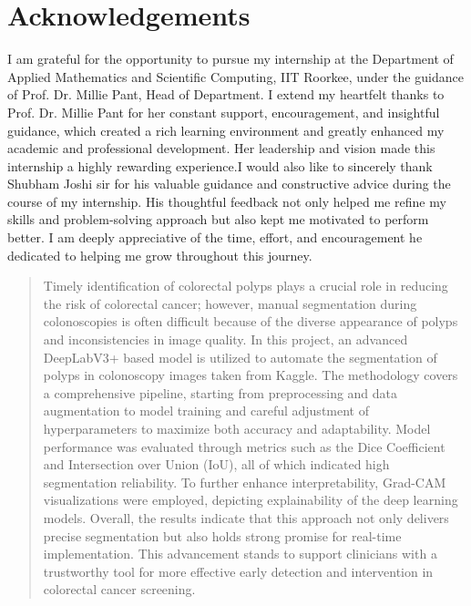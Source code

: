 \documentclass[a4paper,12pt]{report}
\begin{document}
\chapter*{Acknowledgements}
\thispagestyle{empty}

I am grateful for the opportunity to pursue my internship at the Department of Applied Mathematics and Scientific Computing, IIT Roorkee, under the guidance of Prof. Dr. Millie Pant, Head of Department. I extend my heartfelt thanks to Prof. Dr. Millie Pant for her constant support, encouragement, and insightful guidance, which created a rich learning environment and greatly enhanced my academic and professional development. Her leadership and vision made this internship a highly rewarding experience.\newline I would also like to sincerely thank Shubham Joshi sir for his valuable guidance and constructive advice during the course of my internship. His thoughtful feedback not only helped me refine my skills and problem‑solving approach but also kept me motivated to perform better. I am deeply appreciative of the time, effort, and encouragement he dedicated to helping me grow throughout this journey.

\clearpage


\begin{abstract}
Timely identification of colorectal polyps plays a crucial role in reducing the risk of colorectal cancer; however, manual segmentation during colonoscopies is often difficult because of the diverse appearance of polyps and inconsistencies in image quality. In this project, an advanced DeepLabV3+ based model is utilized to automate the segmentation of polyps in colonoscopy images taken from Kaggle. The methodology covers a comprehensive pipeline, starting from preprocessing and data augmentation to model training and careful adjustment of hyperparameters to maximize both accuracy and adaptability. Model performance was evaluated through metrics such as the Dice Coefficient and Intersection over Union (IoU), all of which indicated high segmentation reliability. To further enhance interpretability, Grad-CAM visualizations were employed, depicting explainability of the deep learning models. Overall, the results indicate that this approach not only delivers precise segmentation but also holds strong promise for real-time implementation. This advancement stands to support clinicians with a trustworthy tool for more effective early detection and intervention in colorectal cancer screening.
\end{abstract}
\end{document}
